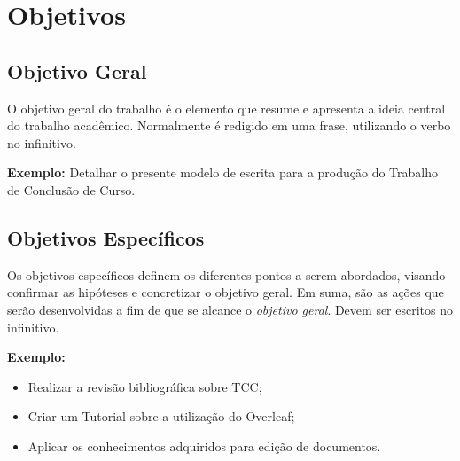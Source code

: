 \chapter{Objetivos}  \label{cap:02}



\section{Objetivo Geral}

O objetivo geral do trabalho é o elemento que resume e apresenta a ideia central do trabalho acadêmico. Normalmente é redigido em uma frase, utilizando o verbo no infinitivo. 

\textbf{Exemplo:} Detalhar o presente modelo de escrita para a produção do Trabalho de Conclusão de Curso.\\

\section{Objetivos Específicos}

Os objetivos específicos definem os diferentes pontos a serem abordados, visando confirmar as hipóteses e concretizar o objetivo geral. Em suma, são as ações que serão desenvolvidas a fim de que se alcance o \textit{objetivo geral}. Devem ser escritos no infinitivo.

\textbf{Exemplo:} 

\begin{itemize}
    \item Realizar a revisão bibliográfica sobre TCC;
    \item Criar um Tutorial sobre a utilização do Overleaf;
    \item Aplicar os conhecimentos adquiridos para edição de documentos.
\end{itemize}